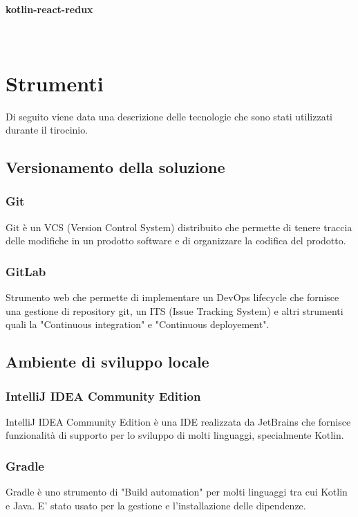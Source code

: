 \paragraph{kotlin-react-redux} \mbox{} \\


\section{Strumenti}
\label{sec:strumenti}

Di seguito viene data una descrizione delle tecnologie che sono stati utilizzati durante il tirocinio.

\subsection{Versionamento della soluzione}
\subsubsection*{Git}
Git è un VCS (Version Control System) distribuito che permette di tenere traccia delle modifiche in un prodotto software e di organizzare la codifica del prodotto.
\subsubsection*{GitLab}
Strumento web che permette di implementare un DevOps lifecycle che fornisce una gestione di repository git, un ITS (Issue Tracking System) e altri strumenti quali la "Continuous integration" e "Continuous deployement".

\subsection{Ambiente di sviluppo locale}
\subsubsection*{IntelliJ IDEA Community Edition}
IntelliJ IDEA Community Edition è una IDE realizzata da JetBrains che fornisce funzionalità di supporto per lo sviluppo di molti linguaggi, specialmente Kotlin.
\subsubsection*{Gradle}
Gradle è uno strumento di "Build automation" per molti linguaggi tra cui Kotlin e Java. E' stato usato per la gestione e l'installazione delle dipendenze.

